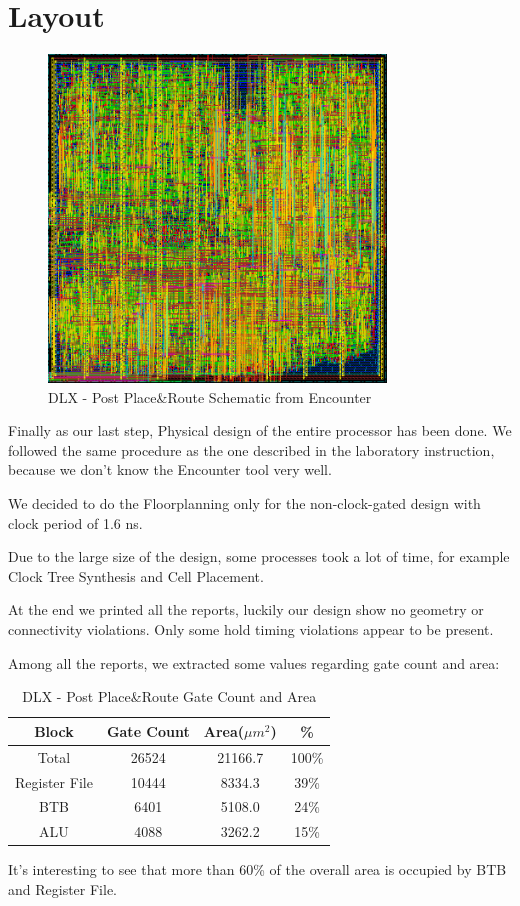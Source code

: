 \documentclass[12pt]{article}
\begin{document}
\section{Layout}\label{Layout}
\begin{figure}[!ht]
	\includegraphics[width=0.8\textwidth, center]{images/dlx-floorplan.jpg}
	\caption{DLX - Post Place\&Route Schematic from Encounter}
	\label{FLORPLANR}
\end{figure}
Finally as our last step, Physical design of the entire processor has been done. We followed the same procedure as the one described in the laboratory instruction, because we don't know the Encounter tool very well.

We decided to do the Floorplanning only for the non-clock-gated design with clock period of 1.6 ns.

Due to the large size of the design, some processes took a lot of time, for example Clock Tree Synthesis and Cell Placement.

At the end we printed all the reports, luckily our design show no geometry or connectivity violations.
Only some hold timing violations appear to be present.


Among all the reports, we extracted some values regarding gate count and area:
\begin{table}
\begin{center}
	\begin{tabular}{ | c | c | c | c |}
		\hline
		\rowcolor{LimeGreen}   Block & Gate Count & Area($\mu m^2$)& \%\\ \hline
		Total & 26524 & 21166.7 & 100\% \\ \hline
		Register File & 10444 & 8334.3 & 39\% \\ \hline
		BTB & 6401 &  5108.0 & 24\% \\ \hline
		ALU & 4088 & 3262.2 & 15\% \\ \hline
	\end{tabular}
	\caption{DLX - Post Place\&Route Gate Count and Area}
	\label{AREA}
\end{center}
\end{table}
It's interesting to see that more than 60\% of the overall area is occupied by BTB and Register File.
\end{document}
